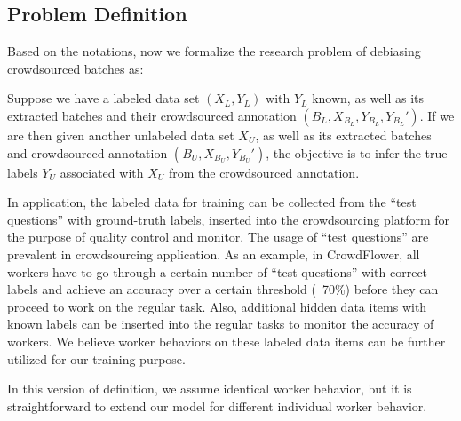 \subsection{Problem Definition}

Based on the notations, 
now we formalize the research problem of debiasing crowdsourced batches as:

\begin{problem} 
Suppose we have a labeled data set $(X_L, Y_L)$ with $Y_L$ known, 
as well as its extracted batches and their crowdsourced annotation $(B_L, X_{B_L}, Y_{B_L}, Y_{B_L}')$.  
If we are then given another unlabeled data set $X_U$, 
as well as its extracted batches and crowdsourced annotation $(B_U, X_{B_U}, Y_{B_U}')$, 
the objective is to infer the true labels $Y_U$ associated with $X_U$ from the crowdsourced annotation.  
\end{problem}

In application, the labeled data for training can be collected from the ``test questions'' with ground-truth labels, 
inserted into the crowdsourcing platform for the purpose of quality control and monitor.  
The usage of ``test questions'' are prevalent in crowdsourcing application.  
As an example, in CrowdFlower, all workers have to go through a certain number of ``test questions'' with correct labels 
and achieve an accuracy over a certain threshold (\eg~70\%) 
before they can proceed to work on the regular task.  
Also, additional hidden data items with known labels can be inserted into the regular tasks 
to monitor the accuracy of workers.  
We believe worker behaviors on these labeled data items can be further utilized for our training purpose.  

In this version of definition, we assume identical worker behavior, 
but it is straightforward to extend our model for different individual worker behavior.  





